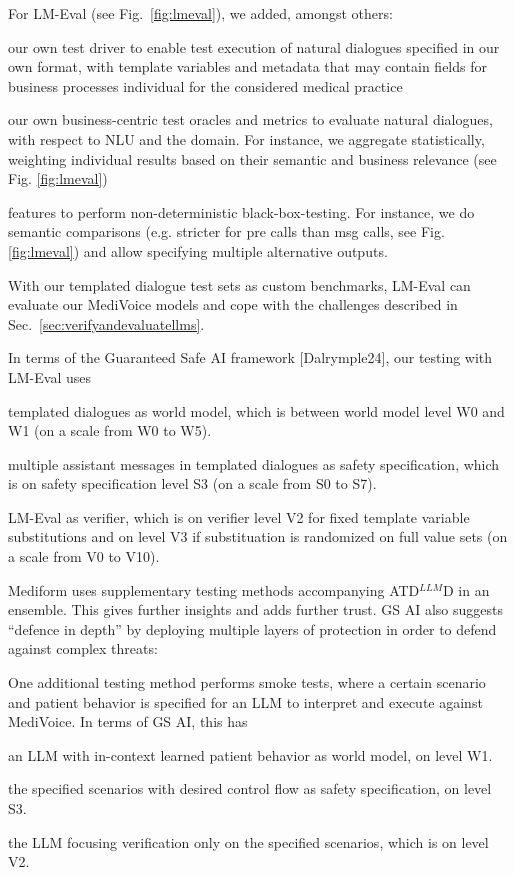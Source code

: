 \documentclass[twocolumn]{article}
\newcommand{\ATDLLMD}{ATD$^{LLM}$D}%
\begin{document}
For LM-Eval (see Fig.~\ref{fig:lmeval}), we added, amongst others:
\begin{compactitem}
\item our own test driver to enable test execution of natural dialogues specified in our own format, with template variables and metadata that may contain fields for business processes individual for the considered medical practice
\item our own business-centric test oracles and metrics to evaluate natural dialogues, with respect to NLU and the domain. For instance, we aggregate statistically, weighting individual results based on their semantic and business relevance (see Fig. \ref{fig:lmeval})
\item features to perform non-deterministic black-box-testing. For instance, we do semantic comparisons (e.g. stricter for pre calls than msg calls, see Fig. \ref{fig:lmeval}) and allow specifying multiple alternative outputs.
\end{compactitem}
With our templated dialogue test sets as custom benchmarks, LM-Eval can evaluate our MediVoice models and cope with the challenges described in Sec.~\ref{sec:verifyandevaluatellms}.

In terms of the Guaranteed Safe AI framework [Dalrymple24], our testing with LM-Eval uses
\begin{compactitem}
\item templated dialogues as world model, which is between world model level W0 and W1 (on a scale from W0 to W5).
\item multiple assistant messages in templated dialogues as safety specification, which is on safety specification level S3 (on a scale from S0 to S7).
\item LM-Eval as verifier, which is on verifier level V2 for fixed template variable substitutions and on level V3 if substituation is randomized on full value sets (on a scale from V0 to V10).
\end{compactitem}

Mediform uses supplementary testing methods accompanying \ATDLLMD{} in an ensemble. This gives further insights and adds further trust.
GS AI also suggests ``defence in depth'' by deploying multiple layers of protection in order to defend against complex threats:

One additional testing method performs smoke tests, where a certain scenario and patient behavior is specified for an LLM to interpret and execute against MediVoice. In terms of GS AI, this has
\begin{compactitem}
\item an LLM with in-context learned patient behavior as world model, on level W1.
\item the specified scenarios with desired control flow as safety specification, on level S3.
\item the LLM focusing verification only on the specified scenarios, which is on level V2.
\end{compactitem}
\end{document}
